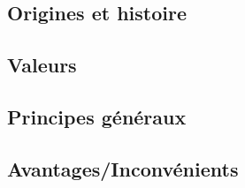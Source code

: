\begin{frame}
\tableofcontents

\end{frame}
    
\subsection{Origines et histoire}
\begin{frame}
\frametitle{\insertsubsection}
\end{frame}

\subsection{Valeurs}
\begin{frame}
\frametitle{\insertsubsection}
\end{frame}

\subsection{Principes généraux}
\begin{frame}
\frametitle{\insertsubsection}
\end{frame}

\subsection{Avantages/Inconvénients}
\begin{frame}
\frametitle{\insertsubsection}
\end{frame}